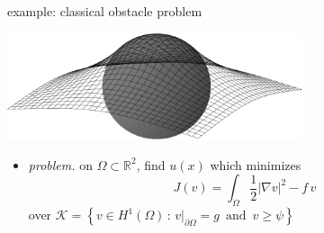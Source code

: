 \documentclass[svgnames,
               hyperref={colorlinks,citecolor=DeepPink4,linkcolor=FireBrick,urlcolor=Maroon},
               usepdftitle=false]  %
               {beamer}
\newcommand{\RR}{\mathbb{R}}
\newcommand{\grad}{\nabla}
\begin{document}
\begin{frame}{example: classical obstacle problem}

\begin{center}
\includegraphics[width=0.65\textwidth]{../talk-oxford/images/obstacle65.pdf}
\end{center}

\begin{itemize}
\item \emph{problem.} on $\Omega \subset \RR^2$, find $u(x)$ which minimizes
    $$J(v) = \int_\Omega \frac{1}{2} |\grad v|^2 - f\, v$$
over $\mathcal{K} = \left\{v \in H^1(\Omega) \,:\, v\big|_{\partial \Omega} = g \,\text{ and }\, v \ge \psi\right\}$
\end{itemize}
\end{frame}
\end{document}
